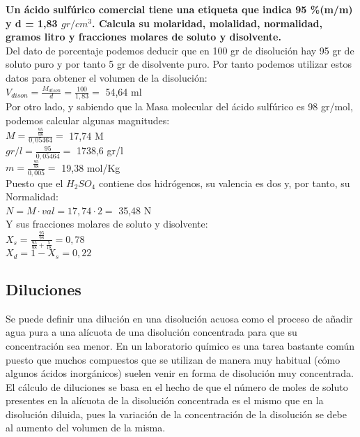 \begin{exercise}
	\textbf{Un ácido sulfúrico comercial tiene una etiqueta que indica 95 \%(m/m) y  d = 1,83 $gr/cm^3$. Calcula su molaridad, molalidad, normalidad, gramos litro y fracciones molares de soluto y disolvente.}\\
	
	Del dato de porcentaje podemos deducir que en 100 gr de disolución hay 95 gr de soluto puro y por tanto 5 gr de disolvente puro. Por tanto podemos utilizar estos datos para obtener el volumen de la  disolución:\\
	
	$V_{dison}=\frac{M_{dison}}{d}=\frac{100}{1,83}=$ 54,64 ml\\
	
	Por otro lado, y sabiendo que la Masa molecular del ácido sulfúrico es 98 gr/mol, podemos calcular algunas magnitudes:\\
	
	$M = \frac{\frac{95}{98}}{0,05464}=$ 17,74 M\\
	
	$gr/l = \frac{95}{0,05464}=$ 1738,6 gr/l\\
	
	$m = \frac{\frac{95}{98}}{0,005}=$ 19,38 mol/Kg\\
	
	Puesto que el $H_2SO_4$ contiene dos hidrógenos, su valencia es dos y, por tanto, su Normalidad:\\
	
	$N=M\cdot val=17,74\cdot 2=$ 35,48 N\\
	
	Y sus fracciones molares de soluto y disolvente:\\
	
	$X_s = \frac{\frac{95}{98}}{\frac{95}{98}+\frac{5}{18}}= 0,78$\\
	
	$X_d=1-X_s=0,22$
\end{exercise}

\subsection{Diluciones}

Se puede definir una dilución en una disolución acuosa como el proceso de añadir agua pura a una alícuota de una disolución concentrada para que su concentración sea menor. En un laboratorio químico es una tarea bastante común puesto que muchos compuestos que se utilizan de manera muy habitual (cómo algunos ácidos inorgánicos) suelen venir en forma de disolución muy concentrada. El cálculo de diluciones se basa en el hecho de que el número de moles de soluto presentes en la alícuota de la disolución concentrada es el mismo que en la disolución diluida, pues la variación de la concentración de la disolución se debe al aumento del volumen de la misma.\\

